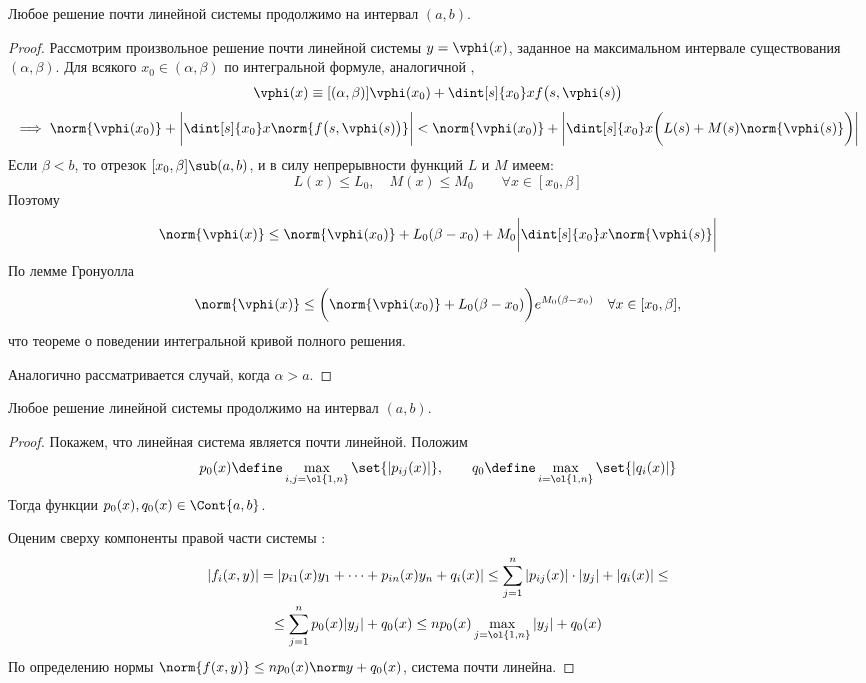 \begin{theorem}
	Любое решение почти линейной системы продолжимо на интервал $ (a, b) $.
\end{theorem}

\begin{proof}
    Рассмотрим произвольное решение почти линейной системы $ y = \vphi(x) $, заданное на максимальном интервале существования $ (\alpha, \beta) $. Для всякого $ x_0 \in (\alpha, \beta) $ по интегральной формуле, аналогичной ,
    $$ \vphi(x) \equiv[(\alpha, \beta)] \vphi(x_0) + \dint[s]{x_0}x{f \big( s, \vphi(s) \big)} $$
    $$ \implies \norm{\vphi(x_0)} + \bigg| \dint[s]{x_0}x{\norm{f \big( s, \vphi(s) \big)}} \bigg| < \norm{\vphi(x_0)} + \bigg| \dint[s]{x_0}x{\bigg( L(s) + M(s) \norm{\vphi(s)} \bigg)} \bigg| $$
    Если $ \beta < b $, то отрезок $ [x_0, \beta] \sub (a, b) $, и в силу непрерывности функций $ L $ и $ M $ имеем:
    $$ L(x) \le L_0, \quad M(x) \le M_0 \qquad \forall x \in [x_0, \beta] $$
    Поэтому
    $$ \norm{\vphi(x)} \le \norm{\vphi(x_0)} + L_0(\beta - x_0) + M_0 \bigg| \dint[s]{x_0}x{\norm{\vphi(s)}} \bigg| $$
    По лемме Гронуолла
    $$ \norm{\vphi(x)} \le \bigg( \norm{\vphi(x_0)} + L_0(\beta - x_0) \bigg)e^{M_0(\beta - x_0)} \quad \forall x \in [x_0, \beta], $$
    что  теореме о поведении интегральной кривой полного решения.

    Аналогично рассматривается случай, когда $ \alpha > a $.
\end{proof}

\begin{theorem}
    Любое решение линейной системы  продолжимо на интервал $ (a, b) $.
\end{theorem}

\begin{proof}
	Покажем, что линейная система является почти линейной. Положим
    $$ p_0(x) \define \max\limits_{i, j = \ol{1, n}} \set{|p_{ij}(x)|}, \qquad q_0 \define \max\limits_{i = \ol{1, n}} \set{|q_i(x)|} $$
    Тогда функции $ p_0(x), q_0(x) \in \Cont{a, b} $.

    Оценим сверху компоненты правой части системы :
    \begin{multline*}
        |f_i(x, y)| = |p_{i1}(x)y_1 + \dots + p_{in}(x)y_n + q_i(x)| \le \sum_{j = 1}^n |p_{ij}(x)| \cdot |y_j| + |q_i(x)| \le \\
        \le \sum_{j = 1}^n p_0(x) |y_j| + q_0(x) \le np_0(x) \max\limits_{j = \ol{1, n}}|y_j| + q_0(x)
    \end{multline*}
    По определению нормы $ \norm{f(x, y)} \le np_0(x)\norm y + q_0(x) $, \ie система  почти линейна.
\end{proof}

